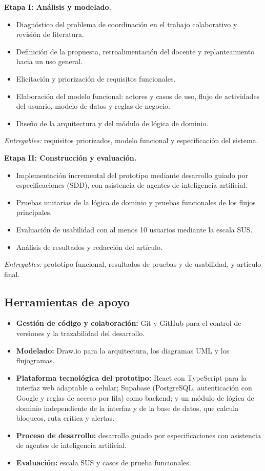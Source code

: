 \documentclass[conference]{IEEEtran}
\begin{document}
\textbf{Etapa I: Análisis y modelado.}
\begin{itemize}
    \item Diagnóstico del problema de coordinación en el trabajo colaborativo y revisión de literatura.
    \item Definición de la propuesta, retroalimentación del docente y replanteamiento hacia un uso general.
    \item Elicitación y priorización de requisitos funcionales.
    \item Elaboración del modelo funcional: actores y casos de uso, flujo de actividades del usuario, modelo de datos y reglas de negocio.
    \item Diseño de la arquitectura y del módulo de lógica de dominio.
\end{itemize}
\textit{Entregables:} requisitos priorizados, modelo funcional y especificación del sistema.

\textbf{Etapa II: Construcción y evaluación.}
\begin{itemize}
    \item Implementación incremental del prototipo mediante desarrollo guiado por especificaciones (SDD), con asistencia de agentes de inteligencia artificial.
    \item Pruebas unitarias de la lógica de dominio y pruebas funcionales de los flujos principales.
    \item Evaluación de usabilidad con al menos 10 usuarios mediante la escala SUS.
    \item Análisis de resultados y redacción del artículo.
\end{itemize}
\textit{Entregables:} prototipo funcional, resultados de pruebas y de usabilidad, y artículo final.

\subsection{Herramientas de apoyo}
\begin{itemize}
    \item \textbf{Gestión de código y colaboración:} Git y GitHub para el control de versiones y la trazabilidad del desarrollo.
    \item \textbf{Modelado:} Draw.io para la arquitectura, los diagramas UML y los flujogramas.
    \item \textbf{Plataforma tecnológica del prototipo:} React con TypeScript para la interfaz web adaptable a celular; Supabase (PostgreSQL, autenticación con Google y reglas de acceso por fila) como backend; y un módulo de lógica de dominio independiente de la interfaz y de la base de datos, que calcula bloqueos, ruta crítica y alertas.
    \item \textbf{Proceso de desarrollo:} desarrollo guiado por especificaciones con asistencia de agentes de inteligencia artificial.
    \item \textbf{Evaluación:} escala SUS \cite{brooke1996sus} y casos de prueba funcionales.
\end{itemize}
\end{document}
